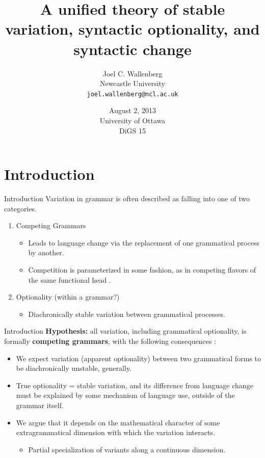 \documentclass[hyperref={pdfpagelabels=false}]{beamer}
\title{A unified theory of stable variation, syntactic optionality, and syntactic change}
\author{Joel C. Wallenberg\\Newcastle University\\\texttt{joel.wallenberg@ncl.ac.uk}}
\institute{}
\date[]{August 2, 2013 \\ University of Ottawa \\ DiGS 15}
\begin{document}
\begin{frame}[plain]
\titlepage
\end{frame}


\section{Introduction}
\begin{frame}{Introduction}
	Variation in grammar is often described as falling into one of two categories.
	
	\begin{enumerate}
		\item Competing Grammars
		\begin{itemize}
			\item Leads to language change via the replacement of one grammatical process by another.
			\item Competition is parameterized in some fashion, as in competing flavors of the same functional head \citep{kroch1994}.
		\end{itemize}
		\item Optionality (within a grammar?)
		\begin{itemize}
			\item Diachronically stable variation between grammatical processes.
		\end{itemize}
	\end{enumerate}
	
\end{frame}

\begin{frame}{Introduction}
	\textbf{Hypothesis:} all variation, including grammatical optionality, is formally \textbf{competing grammars}, with the following consequences \citep{fruehwaldwallenberg2013}:
	\begin{itemize}
		\item We expect variation (apparent optionality) between two grammatical forms to be diachronically unstable, generally.
		\item True optionality = stable variation, and its difference from language change must be explained by some mechanism of language use, outside of the grammar itself. 
		\item We argue that it depends on the mathematical character of some extragrammatical dimension with which the variation interacts.
			\begin{itemize} \item Partial specialization of variants along a continuous dimension. \end{itemize}
	\end{itemize}

\end{frame}
\end{document}
